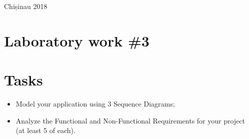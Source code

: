 \documentclass[12pt,a4paper,titlepage]{article}
\begin{document}
\begin{titlepage}
\begin{center}
      \vspace{5 mm}


      {\large Chișinau 2018}\\[3cm] %




      \vfill %
      \end{center}
      
\end{titlepage}

\cleardoublepage

\newpage

\setcounter{page}{1}
\setcounter{secnumdepth}{4}

\cleardoublepage


{}
\section*{Laboratory work \#3}

\section{Tasks}
\begin{itemize}
	\item
	Model your application using 3 Sequence Diagrams;
	\item 
	Analyze the Functional and Non-Functional Requirements for your project (at least
5 of each).
\end{itemize}
\end{document}

